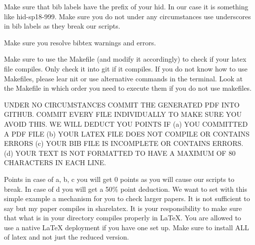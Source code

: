 Make sure that bib labels have the prefix of your hid. In our case it
is something like hid-sp18-999. Make sure you do not under any
circumstances use underscores in bib labels as they break our scripts.

Make sure you resolve bibtex warnings and errors.

Make sure to use the Makefile (and modify it accordingly) to check if
your latex file compiles. Only check it into git if it compiles. If
you do not know how to use Makefiles, please lear nit or use alternative
commands in the terminal. Look at the Makefile in which order you
need to execute them if you do not use makefiles. 

UNDER NO CIRCUMSTANCES COMMIT THE GENERATED PDF INTO GITHUB. COMMIT
EVERY FILE INDIVIDUALLY TO MAKE SURE YOU AVOID THIS. WE WILL
DEDUCT YOU POINTS IF (a) YOU COMMITTED A PDF FILE (b) YOUR LATEX FILE
DOES NOT COMPILE OR CONTAINS ERRORS (c) YOUR BIB FILE IS INCOMPLETE OR
CONTAINS ERRORS. (d) YOUR TEXT IS NOT FORMATTED TO HAVE A MAXIMUM OF
80 CHARACTERS IN EACH LINE. 

Points in case of a, b, c you will get 0 points as you will cause our
scripts to break. In case of d you will get a 50\% point deduction. We
want to set with this simple example a mechanism for you to check
larger papers. It is not sufficient to say but my paper compiles in
sharelatex. It is your responsibility to make sure that what is in your
directory compiles properly in LaTeX. You are allowed to use a native
LaTeX deployment if you have one set up. Make sure to install ALL of
latex and not just the reduced version. 

